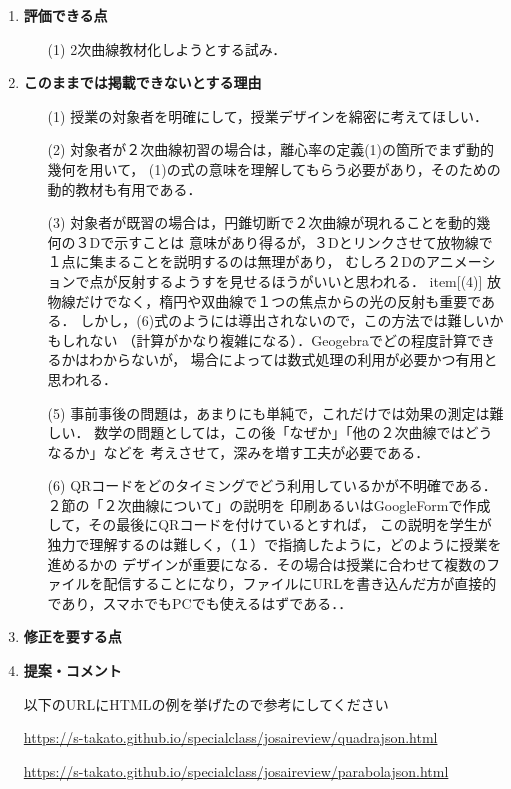 \documentclass[11pt]{jarticle}
\begin{document}
\begin{enumerate}
\item%
{\bf 評価できる点}
\begin{enumerate}
\item[(1)]%
2次曲線教材化しようとする試み．
\end{enumerate}

\item%
{\bf このままでは掲載できないとする理由}
\begin{enumerate}
\item[(1)]%
授業の対象者を明確にして，授業デザインを綿密に考えてほしい．
\item[(2)]%
対象者が２次曲線初習の場合は，離心率の定義(1)の箇所でまず動的幾何を用いて，
(1)の式の意味を理解してもらう必要があり，そのための動的教材も有用である．

\item[(3)]%
対象者が既習の場合は，円錐切断で２次曲線が現れることを動的幾何の３Dで示すことは
意味があり得るが，３Dとリンクさせて放物線で１点に集まることを説明するのは無理があり，
むしろ２Dのアニメーションで点が反射するようすを見せるほうがいいと思われる．
item[(4)]%
放物線だけでなく，楕円や双曲線で１つの焦点からの光の反射も重要である．
しかし，(6)式のようには導出されないので，この方法では難しいかもしれない
（計算がかなり複雑になる）．Geogebraでどの程度計算できるかはわからないが，
場合によっては数式処理の利用が必要かつ有用と思われる．
\item[(5)]%
事前事後の問題は，あまりにも単純で，これだけでは効果の測定は難しい．
数学の問題としては，この後「なぜか」「他の２次曲線ではどうなるか」などを
考えさせて，深みを増す工夫が必要である．
\item[(6)]%
QRコードをどのタイミングでどう利用しているかが不明確である．２節の「２次曲線について」の説明を
印刷あるいはGoogleFormで作成して，その最後にQRコードを付けているとすれば，
この説明を学生が独力で理解するのは難しく，（１）で指摘したように，どのように授業を進めるかの
デザインが重要になる．その場合は授業に合わせて複数のファイルを配信することになり，ファイルにURLを書き込んだ方が直接的であり，スマホでもPCでも使えるはずである．．

\end{enumerate}

\item%
{\bf 修正を要する点}


\item%
{\bf 提案・コメント}

以下のURLにHTMLの例を挙げたので参考にしてください

{\small
\url{https://s-takato.github.io/specialclass/josaireview/quadrajson.html}
}

{\small
\url{https://s-takato.github.io/specialclass/josaireview/parabolajson.html}
}


\end{enumerate}
\end{document}
